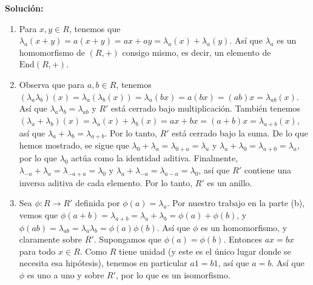 \begin{enumerate}
\textbf{Solución:}
\begin{enumerate}
        \item Para $x, y \in R$, tenemos que $\lambda_a(x + y) = a(x + y) = ax + ay = \lambda_a(x) + \lambda_a(y)$. Así que $\lambda_a$ es un homomorfismo de $(R, +)$ consigo mismo, es decir, un elemento de $\text{End}(R, +)$.
        \item Observa que para $a, b \in R$, tenemos $(\lambda_a \lambda_b)(x) = \lambda_a(\lambda_b(x)) = \lambda_a(bx) = a(bx) = (ab)x = \lambda_{ab}(x)$. Así que $\lambda_a \lambda_b = \lambda_{ab}$ y $R'$ está cerrado bajo multiplicación. También tenemos $(\lambda_a + \lambda_b)(x) = \lambda_a(x) + \lambda_b(x) = ax + bx = (a + b)x = \lambda_{a+b}(x)$, así que $\lambda_a + \lambda_b = \lambda_{a+b}$. Por lo tanto, $R'$ está cerrado bajo la suma. De lo que hemos mostrado, se sigue que $\lambda_0 + \lambda_a = \lambda_{0+a} = \lambda_a$ y $\lambda_a + \lambda_0 = \lambda_{a+0} = \lambda_a$, por lo que $\lambda_0$ actúa como la identidad aditiva. Finalmente, $\lambda_{-a} + \lambda_a = \lambda_{-a+a} = \lambda_0$ y $\lambda_a + \lambda_{-a} = \lambda_{a-a} = \lambda_0$, así que $R'$ contiene una inversa aditiva de cada elemento. Por lo tanto, $R'$ es un anillo.
        \item Sea $\phi : R \rightarrow R'$ definida por $\phi(a) = \lambda_a$. Por nuestro trabajo en la parte (b), vemos que $\phi(a + b) = \lambda_{a+b} = \lambda_a + \lambda_b = \phi(a) + \phi(b)$, y $\phi(ab) = \lambda_{ab} = \lambda_a \lambda_b = \phi(a) \phi(b)$. Así que $\phi$ es un homomorfismo, y claramente sobre $R'$. Supongamos que $\phi(a) = \phi(b)$. Entonces $ax = bx$ para todo $x \in R$. Como $R$ tiene unidad (y este es el único lugar donde se necesita esa hipótesis), tenemos en particular $a1 = b1$, así que $a = b$. Así que $\phi$ es uno a uno y sobre $R'$, por lo que es un isomorfismo.
\end{enumerate}

\end{enumerate}